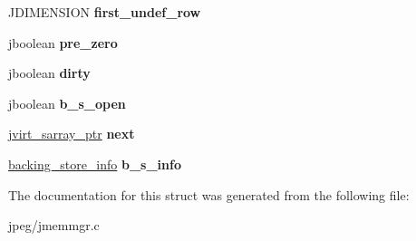 \begin{DoxyCompactItemize}
\item 
J\+D\+I\+M\+E\+N\+S\+I\+ON {\bfseries first\+\_\+undef\+\_\+row}\hypertarget{structjvirt__sarray__control_a049e8066e21d2fca662be25e4365259a}{}\label{structjvirt__sarray__control_a049e8066e21d2fca662be25e4365259a}

\item 
jboolean {\bfseries pre\+\_\+zero}\hypertarget{structjvirt__sarray__control_ae3826fef70bc1a2b6801a56637770b2d}{}\label{structjvirt__sarray__control_ae3826fef70bc1a2b6801a56637770b2d}

\item 
jboolean {\bfseries dirty}\hypertarget{structjvirt__sarray__control_acd3bcf860c8e7180f7bbfba9e2b10db1}{}\label{structjvirt__sarray__control_acd3bcf860c8e7180f7bbfba9e2b10db1}

\item 
jboolean {\bfseries b\+\_\+s\+\_\+open}\hypertarget{structjvirt__sarray__control_a23a5e3c6ab7bb517b17e90d13f2d6932}{}\label{structjvirt__sarray__control_a23a5e3c6ab7bb517b17e90d13f2d6932}

\item 
\hyperlink{structjvirt__sarray__control}{jvirt\+\_\+sarray\+\_\+ptr} {\bfseries next}\hypertarget{structjvirt__sarray__control_aed2d873c89cff97caf93e77b279bdecb}{}\label{structjvirt__sarray__control_aed2d873c89cff97caf93e77b279bdecb}

\item 
\hyperlink{structbacking__store__struct}{backing\+\_\+store\+\_\+info} {\bfseries b\+\_\+s\+\_\+info}\hypertarget{structjvirt__sarray__control_ab5aaaed7f94dc70e0331855bdd6d4972}{}\label{structjvirt__sarray__control_ab5aaaed7f94dc70e0331855bdd6d4972}

\end{DoxyCompactItemize}


The documentation for this struct was generated from the following file\+:\begin{DoxyCompactItemize}
\item 
jpeg/jmemmgr.\+c\end{DoxyCompactItemize}
